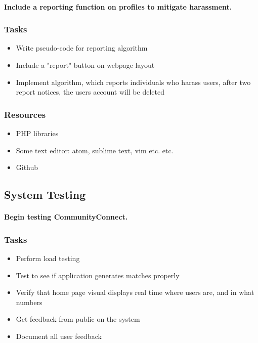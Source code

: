 \documentclass[12pt]{article}
\begin{document}
			\paragraph{Include a reporting function on profiles to mitigate harassment. }
			\subsubsection{\bf Tasks}
				\begin{itemize}
					\item Write pseudo-code for reporting algorithm
					\item Include a "report" button on webpage layout
					\item Implement algorithm, which reports individuals who harass users, after two report notices, the users account will be deleted
				\end{itemize}
	  	\subsubsection{\bf Resources}
				\begin{itemize}
 					\item PHP libraries
			 		\item Some text editor: atom, sublime text, vim etc. etc.
			 		\item Github
				\end{itemize}

		\subsection{\bf System Testing}
			\paragraph{Begin testing CommunityConnect.}
			\subsubsection{\bf Tasks}
				\begin{itemize}
					\item Perform load testing
					\item Test to see if application generates matches properly
					\item Verify that home page visual displays real time where users are, and in what numbers
					\item Get feedback from public on the system
					\item Document all user feedback
				\end{itemize}
\end{document}

